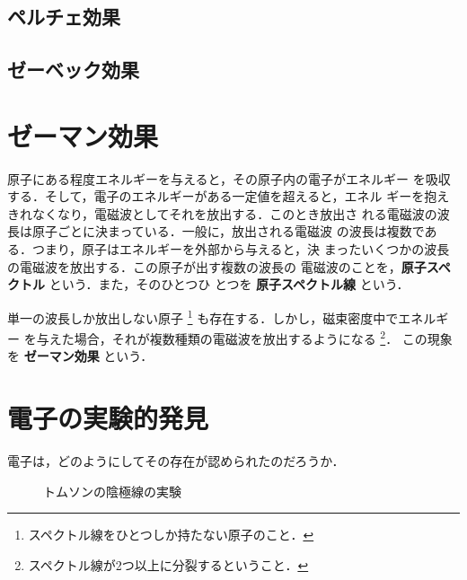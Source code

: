         \subsection{ペルチェ効果}

        \subsection{ゼーベック効果}

    \section{ゼーマン効果}\label{subsec:ZeemanEffect}
        原子にある程度エネルギーを与えると，その原子内の電子がエネルギー
        を吸収する．そして，電子のエネルギーがある一定値を超えると，エネル
        ギーを抱えきれなくなり，電磁波としてそれを放出する．このとき放出さ
        れる電磁波の波長は原子ごとに決まっている．一般に，放出される電磁波
        の波長は複数である．つまり，原子はエネルギーを外部から与えると，決
        まったいくつかの波長の電磁波を放出する．この原子が出す複数の波長の
        電磁波のことを，\textbf{原子スペクトル} という．また，そのひとつひ
        とつを \textbf{原子スペクトル線} という．

        単一の波長しか放出しない原子
            \footnote{
                スペクトル線をひとつしか持たない原子のこと．
            }
        も存在する．しかし，磁束密度中でエネルギー
        を与えた場合，それが複数種類の電磁波を放出するようになる
            \footnote{
                スペクトル線が2つ以上に分裂するということ．
            }．
        この現象を \textbf{ゼーマン効果} という．

    \section{電子の実験的発見}
        電子は，どのようにしてその存在が認められたのだろうか．
            \begin{figure}[hbt]
                \begin{center}
                    \caption{トムソンの陰極線の実験}
                    \label{fig:ThomomExpElec001}
                \end{center}
            \end{figure}

